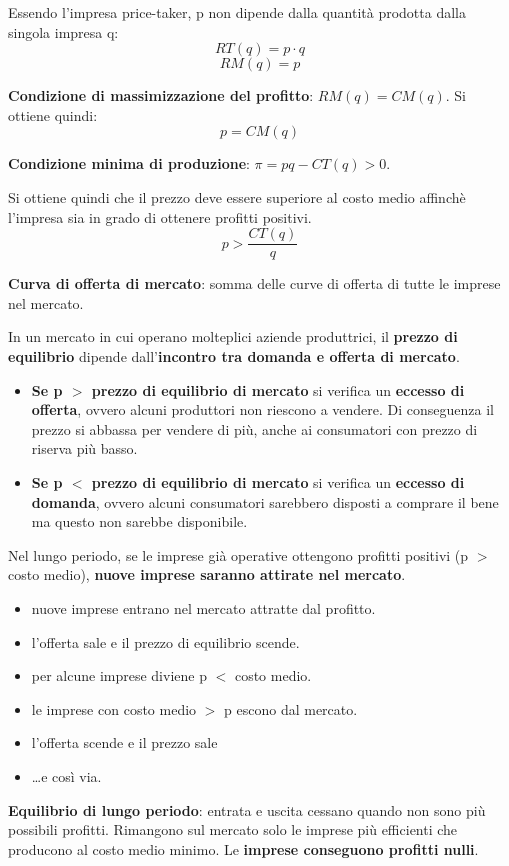\documentclass[../main.tex]{subfiles}
\begin{document}
Essendo l'impresa price-taker, p non dipende dalla quantità prodotta dalla singola impresa q:
$$RT(q) = p\cdot q$$
$$RM(q) = p$$

\textbf{Condizione di massimizzazione del profitto}: $RM(q) = CM(q)$. Si ottiene quindi:
$$p = CM(q)$$

\textbf{Condizione minima di produzione}: $\pi = pq - CT(q) > 0$.

Si ottiene quindi che il prezzo deve essere superiore al costo medio affinchè l'impresa sia in grado di ottenere profitti positivi.
$$p > \frac{CT(q)}{q}$$

\textbf{Curva di offerta di mercato}: somma delle curve di offerta di tutte le imprese nel mercato.

In un mercato in cui operano molteplici aziende produttrici, il \textbf{prezzo di equilibrio} dipende dall'\textbf{incontro tra domanda e offerta di mercato}.

\begin{itemize}
    \item \textbf{Se p $>$ prezzo di equilibrio di mercato} si verifica un \textbf{eccesso di offerta}, ovvero alcuni produttori non riescono a vendere. Di conseguenza il prezzo si abbassa per vendere di più, anche ai consumatori con prezzo di riserva più basso.
    \item \textbf{Se p $<$ prezzo di equilibrio di mercato} si verifica un \textbf{eccesso di domanda}, ovvero alcuni consumatori sarebbero disposti a comprare il bene ma questo non sarebbe disponibile.
\end{itemize}

Nel lungo periodo, se le imprese già operative ottengono profitti positivi (p $>$ costo medio), \textbf{nuove imprese saranno attirate nel mercato}.

\begin{itemize}
    \item nuove imprese entrano nel mercato attratte dal profitto.
    \item l'offerta sale e il prezzo di equilibrio scende.
    \item per alcune imprese diviene p $<$ costo medio.
    \item le imprese con costo medio $>$ p escono dal mercato.
    \item l'offerta scende e il prezzo sale
    \item \dots e così via.
\end{itemize}

\textbf{Equilibrio di lungo periodo}: entrata e uscita cessano quando non sono più possibili profitti. Rimangono sul mercato solo le imprese più efficienti che producono al costo medio minimo. Le \textbf{imprese conseguono profitti nulli}.
\end{document}
